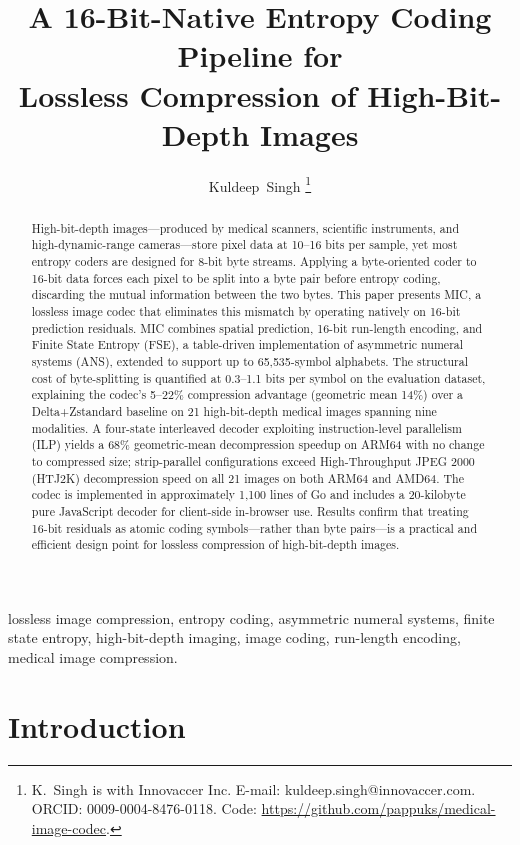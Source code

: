 \documentclass[journal]{IEEEtran}
\title{A 16-Bit-Native Entropy Coding Pipeline for\\
       Lossless Compression of High-Bit-Depth Images}
\author{Kuldeep~Singh%
\thanks{K.\ Singh is with Innovaccer Inc.
E-mail: kuldeep.singh@innovaccer.com.
ORCID: 0009-0004-8476-0118.
Code: \url{https://github.com/pappuks/medical-image-codec}.}%
}
\begin{document}
\maketitle

\begin{abstract}
High-bit-depth images---produced by medical scanners, scientific instruments,
and high-dynamic-range cameras---store pixel data at 10--16 bits per sample,
yet most entropy coders are designed for 8-bit byte streams. Applying a
byte-oriented coder to 16-bit data forces each pixel to be split into a byte
pair before entropy coding, discarding the mutual information between the two
bytes. This paper presents MIC, a lossless image codec that eliminates this
mismatch by operating natively on 16-bit prediction residuals. MIC combines
spatial prediction, 16-bit run-length encoding, and Finite State Entropy
(FSE), a table-driven implementation of asymmetric numeral systems (ANS),
extended to support up to 65,535-symbol alphabets. The structural cost of
byte-splitting is quantified at 0.3--1.1 bits per symbol on the evaluation
dataset, explaining the codec's 5--22\% compression advantage (geometric mean
14\%) over a Delta+Zstandard baseline on 21 high-bit-depth medical images
spanning nine modalities. A four-state interleaved decoder exploiting
instruction-level parallelism (ILP) yields a 68\% geometric-mean decompression
speedup on ARM64 with no change to compressed size; strip-parallel
configurations exceed High-Throughput JPEG 2000 (HTJ2K) decompression speed
on all 21 images on both ARM64 and AMD64. The codec is implemented in
approximately 1,100 lines of Go and includes a 20-kilobyte pure JavaScript
decoder for client-side in-browser use. Results confirm that treating 16-bit
residuals as atomic coding symbols---rather than byte pairs---is a practical
and efficient design point for lossless compression of high-bit-depth images.
\end{abstract}

\begin{IEEEkeywords}
lossless image compression, entropy coding, asymmetric numeral systems,
finite state entropy, high-bit-depth imaging, image coding, run-length
encoding, medical image compression.
\end{IEEEkeywords}

\section{Introduction}
\label{sec:intro}
\end{document}
